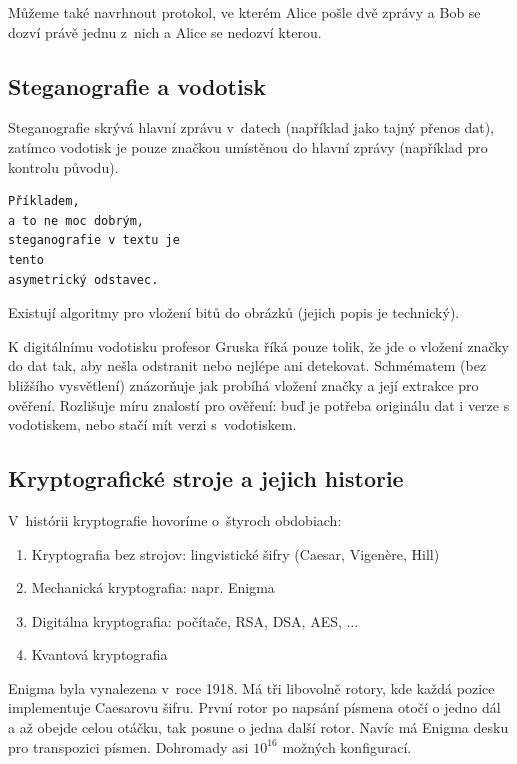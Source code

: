 Můžeme také navrhnout protokol, ve kterém Alice pošle dvě zprávy a Bob
se dozví právě jednu z~nich a Alice se nedozví kterou.

\subsection{Steganografie a vodotisk}

Steganografie skrývá hlavní zprávu v~datech (například jako tajný přenos
dat), zatímco vodotisk je pouze
značkou umístěnou do hlavní zprávy (například pro kontrolu původu).

\begin{verbatim}
Příkladem,
a to ne moc dobrým,
steganografie v textu je
tento
asymetrický odstavec.
\end{verbatim}

Existují algoritmy pro vložení bitů do obrázků (jejich popis je
technický).

K digitálnímu vodotisku profesor Gruska říká pouze tolik, že jde o
vložení značky do dat tak, aby nešla odstranit nebo nejlépe ani
detekovat. Schmématem (bez bližšího vysvětlení) znázorňuje jak probíhá
vložení značky a její extrakce pro ověření. Rozlišuje míru znalostí pro
ověření: buď je potřeba originálu dat i verze s vodotiskem, nebo stačí
mít verzi s~vodotiskem.


\subsection{Kryptografické stroje a jejich historie}

V~histórii kryptografie hovoríme o~štyroch obdobiach:
\begin{enumerate}
	\item Kryptografia bez strojov: lingvistické šifry (Caesar, Vigenère, Hill)
	\item Mechanická kryptografia: napr. Enigma
	\item Digitálna kryptografia: počítače, RSA, DSA, AES, ...
	\item Kvantová kryptografia
\end{enumerate}

Enigma byla vynalezena v~roce 1918. Má tři libovolně rotory, kde každá
pozice implementuje Caesarovu šifru. První rotor po napsání písmena
otočí o jedno dál a až obejde celou otáčku, tak posune o jedna další
rotor.  Navíc má Enigma desku pro transpozici písmen. Dohromady asi
$10^{16}$ možných konfigurací.

